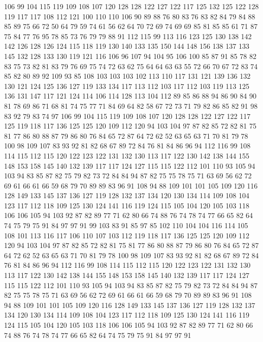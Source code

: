 106 99 104 115 119 109 108 107 120 128 128 122 127 122 117 125 132 125 122 128
119 117 117 108 112 121 100 110 110 106 90 89 88 76 80 83 76 83 82 84
79 84 88 85 89 75 66 72 50 64 79 59 74 61 56 62 64 70 72 69
74 69 69 85 81 85 85 61 71 87 75 84 77 76 95 78 85 73 76 79
79 88 91 112 115 99 113 116 123 125 130 138 142 142 126 128 126 124 115 118
119 130 140 133 135 150 144 148 156 138 137 133 145 132 128 133 130 119 121 116
106 96 107 94 104 95 106 100 85 87 91 85 78 82 83 75 73 82 81 83
79 76 69 75 74 72 63 62 75 64 64 63 63 55 72 66 70 67 72 83
74 85 82 80 89 92 109 93 85 108 103 103 103 102 113 110 117 131 121 139
136 132 130 121 124 125 136 127 119 133 134 117 113 112 103 117 112 103 119 113
125 136 131 147 117 121 124 114 106 114 128 113 104 112 89 85 86 88 94 86
90 84 90 81 78 69 86 71 68 81 74 75 77 71 84 69 64 82 58 67
72 73 71 79 82 86 85 82 91 98 83 92 79 83 74 97 106 99 104 115
119 109 108 107 120 128 128 122 127 122 117 125 119 118 117 136 125 125 120 109
112 120 94 103 104 97 87 82 85 72 82 81 75 81 77 86 80 88 87 79
86 80 76 84 65 72 87 64 72 62 52 63 65 63 71 70 81 79 78 100
98 109 107 83 93 92 81 82 68 67 89 72 84 76 81 84 86 96 94 112
116 99 108 114 115 112 115 120 122 123 122 131 132 130 113 117 122 130 142 138
144 155 148 153 158 145 140 132 139 117 117 124 127 115 115 122 112 101 110 93
105 94 103 94 83 85 87 82 75 79 82 73 72 84 84 94 87 82 75 75
78 75 71 63 69 56 62 72 69 61 66 61 66 59 68 79 70 89 89 83
96 91 108 94 88 109 101 101 105 109 120 116 128 149 133 145 137 136 127 119
128 132 137 134 120 130 134 114 109 108 104 123 117 112 118 109 125 130 124 141
116 119 124 115 105 104 120 105 103 118 106 106 105 94 103 92 87 82 89 77
71 62 80 66 74 88 76 74 78 74 77 66 65 82 64 74 75 79 75 91
84 97 97 91 99 103 83 91 85 97 85 102 110 104 104 116 114 105 108 101
113 116 117 106 110 107 103 112 119 118 117 136 125 125 120 109 112 120 94 103
104 97 87 82 85 72 82 81 75 81 77 86 80 88 87 79 86 80 76 84
65 72 87 64 72 62 52 63 65 63 71 70 81 79 78 100 98 109 107 83
93 92 81 82 68 67 89 72 84 76 81 84 86 96 94 112 116 99 108 114
115 112 115 120 122 123 122 131 132 130 113 117 122 130 142 138 144 155 148 153
158 145 140 132 139 117 117 124 127 115 115 122 112 101 110 93 105 94 103 94
83 85 87 82 75 79 82 73 72 84 84 94 87 82 75 75 78 75 71 63
69 56 62 72 69 61 66 61 66 59 68 79 70 89 89 83 96 91 108 94
88 109 101 101 105 109 120 116 128 149 133 145 137 136 127 119 128 132 137 134
120 130 134 114 109 108 104 123 117 112 118 109 125 130 124 141 116 119 124 115
105 104 120 105 103 118 106 106 105 94 103 92 87 82 89 77 71 62 80 66
74 88 76 74 78 74 77 66 65 82 64 74 75 79 75 91 84 97 97 91
